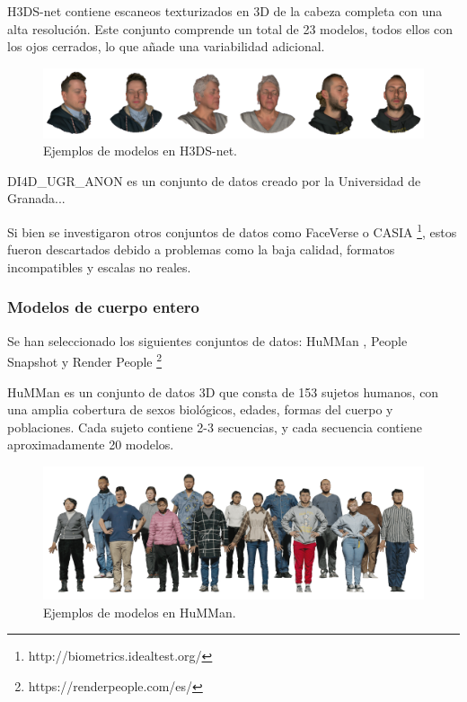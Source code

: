 H3DS-net \cite{61} contiene escaneos texturizados en 3D de la cabeza completa con una alta resolución. Este conjunto comprende un total de 23 modelos, todos ellos con los ojos cerrados, lo que añade una variabilidad adicional.

\begin{figure}[h]
	\centering
	\includegraphics[scale=0.18]{imagenes/cap4/h3dsnet.png}
	\caption[Ejemplos H3DS-net.]{Ejemplos de modelos en H3DS-net.}
	\label{fig18}
\end{figure}

DI4D\_UGR\_ANON es un conjunto de datos creado por la Universidad de Granada...

Si bien se investigaron otros conjuntos de datos como FaceVerse \cite{64} o CASIA \footnote{http://biometrics.idealtest.org/}, estos fueron descartados debido a problemas como la baja calidad, formatos incompatibles y escalas no reales.

\subsubsection{Modelos de cuerpo entero}
Se han seleccionado los siguientes conjuntos de datos: HuMMan \cite{62}, People Snapshot \cite{63} y Render People \footnote{https://renderpeople.com/es/}

HuMMan \cite{62} es un conjunto de datos 3D que consta de 153 sujetos humanos, con una amplia cobertura de sexos biológicos, edades, formas del cuerpo y poblaciones. Cada sujeto contiene 2-3 secuencias, y cada secuencia contiene aproximadamente 20 modelos.

\begin{figure}[h]
	\centering
	\includegraphics[scale=0.4]{imagenes/cap4/humman.png}
	\caption[Ejemplos HuMMan.]{Ejemplos de modelos en HuMMan.}
	\label{fig19}
\end{figure}

